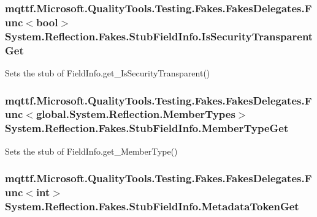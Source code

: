 \hypertarget{class_system_1_1_reflection_1_1_fakes_1_1_stub_field_info_a841eab07b1004e3cb80d2577040784dd}{
\subsubsection[{Is\-Security\-Transparent\-Get}]{\setlength{\rightskip}{0pt plus 5cm}mqttf.\-Microsoft.\-Quality\-Tools.\-Testing.\-Fakes.\-Fakes\-Delegates.\-Func$<$bool$>$ System.\-Reflection.\-Fakes.\-Stub\-Field\-Info.\-Is\-Security\-Transparent\-Get}}\label{class_system_1_1_reflection_1_1_fakes_1_1_stub_field_info_a841eab07b1004e3cb80d2577040784dd}


Sets the stub of Field\-Info.\-get\-\_\-\-Is\-Security\-Transparent()

\hypertarget{class_system_1_1_reflection_1_1_fakes_1_1_stub_field_info_a3bfff5634f79d2fc53e10d53f211b194}{
\subsubsection[{Member\-Type\-Get}]{\setlength{\rightskip}{0pt plus 5cm}mqttf.\-Microsoft.\-Quality\-Tools.\-Testing.\-Fakes.\-Fakes\-Delegates.\-Func$<$global.\-System.\-Reflection.\-Member\-Types$>$ System.\-Reflection.\-Fakes.\-Stub\-Field\-Info.\-Member\-Type\-Get}}\label{class_system_1_1_reflection_1_1_fakes_1_1_stub_field_info_a3bfff5634f79d2fc53e10d53f211b194}


Sets the stub of Field\-Info.\-get\-\_\-\-Member\-Type()

\hypertarget{class_system_1_1_reflection_1_1_fakes_1_1_stub_field_info_a31fdb8aaa9b80aab81cfb3ef94df3ab8}{
\subsubsection[{Metadata\-Token\-Get}]{\setlength{\rightskip}{0pt plus 5cm}mqttf.\-Microsoft.\-Quality\-Tools.\-Testing.\-Fakes.\-Fakes\-Delegates.\-Func$<$int$>$ System.\-Reflection.\-Fakes.\-Stub\-Field\-Info.\-Metadata\-Token\-Get}}\label{class_system_1_1_reflection_1_1_fakes_1_1_stub_field_info_a31fdb8aaa9b80aab81cfb3ef94df3ab8}


